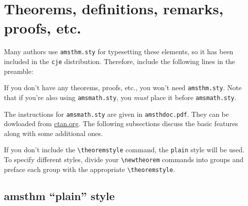 \documentclass{cje}          %
\theoremstyle{plain}%
\theoremstyle{definition}
\theoremstyle{remark}
\begin{document}
\section{Theorems, definitions, remarks, proofs, etc.}

Many authors use \texttt{amsthm.sty} for typesetting these elements, so it has been included in the \texttt{cje} distribution. Therefore, include the following lines in the preamble:
If you don't have any theorems, proofs, etc., you won't need \texttt{amsthm.sty}. 
Note that if you're also using  \texttt{amsmath.sty}, you \emph{must} place it before \texttt{amsmath.sty}.

The instructions for \texttt{amsmath.sty} are given in \texttt{amsthdoc.pdf}. They can be dowloaded from  \href{http://ctan.org/}{ctan.org}. The following subsections discuss the basic features along with some additional ones.

If you don't include the \verb"\theoremstyle" command, the \texttt{plain} style will be used. To specify different styles, divide your \verb"\newtheorem" commands into groups and preface each group with the appropriate \verb"\theoremstyle".

\subsection{amsthm ``plain'' style}
\end{document}
